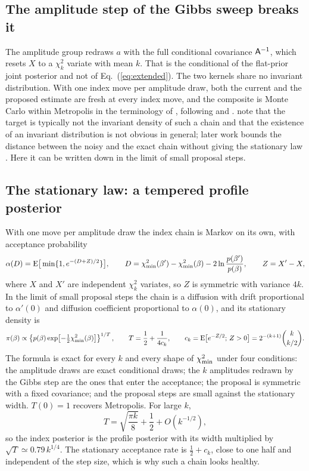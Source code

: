 \subsection{The amplitude step of the Gibbs sweep breaks it}

The amplitude group redraws $a$ with the full conditional covariance $\mathsf{A}^{-1}$, which resets $X$ to a
$\chi^2_k$ variate with mean $k$. That is the conditional of the flat-prior joint posterior and not of
Eq.~(\ref{eq:extended}). The two kernels share no invariant distribution. With one index move per
amplitude draw, both the current and the proposed estimate are fresh at every index move, and the
composite is Monte Carlo within Metropolis in the terminology of \citet{andrieu2009}, following
\citet{oneill2000} and \citet{beaumont2003}. \citet{andrieu2009} note that the target is typically
not the invariant density of such a chain and that the existence of an invariant distribution is not
obvious in general; later work bounds the distance between the noisy and the exact chain without
giving the stationary law \citep{alquier2016,medina2016}. Here it can be written down in the limit of small proposal steps.

\subsection{The stationary law: a tempered profile posterior}

With one move per amplitude draw the index chain is Markov on its own, with acceptance probability
\begin{equation}
  \alpha(D) = \mathrm{E}\big[\min\{1, e^{-(D+Z)/2}\}\big], \qquad
  D = \chi^2_{\min}(\beta') - \chi^2_{\min}(\beta) - 2\ln\frac{p(\beta')}{p(\beta)}, \qquad Z = X' - X ,
\end{equation}
where $X$ and $X'$ are independent $\chi^2_k$ variates, so $Z$ is symmetric with variance $4k$. In the
limit of small proposal steps the chain is a diffusion with drift proportional to $\alpha'(0)$ and
diffusion coefficient proportional to $\alpha(0)$, and its stationary density is
\begin{equation}
  \pi(\beta) \propto \left\{ p(\beta) \exp\!\left[-\tfrac12\chi^2_{\min}(\beta)\right] \right\}^{1/T},
  \qquad T = \frac12 + \frac{1}{4 c_k}, \qquad
  c_k = \mathrm{E}\big[e^{-Z/2};\, Z > 0\big] = 2^{-(k+1)} \binom{k}{k/2} .
  \label{eq:Tk}
\end{equation}
The formula is exact for every $k$ and every shape of $\chi^2_{\min}$ under four conditions: the amplitude
draws are exact conditional draws; the $k$ amplitudes redrawn by the Gibbs step are the ones that
enter the acceptance; the proposal is symmetric with a fixed covariance; and the proposal steps are
small against the stationary width. $T(0) = 1$ recovers Metropolis. For large $k$,
\begin{equation}
  T = \sqrt{\frac{\pi k}{8}} + \frac12 + O(k^{-1/2}) ,
  \label{eq:Tlarge}
\end{equation}
so the index posterior is the profile posterior with its width multiplied by
$\sqrt{T} \simeq 0.79\, k^{1/4}$. The stationary acceptance rate is $\tfrac12 + c_k$, close to one half
and independent of the step size, which is why such a chain looks healthy.

